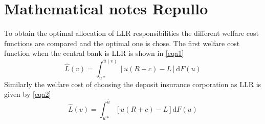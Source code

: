 \documentclass[twoside, 12pt]{article}
\numberwithin{equation}{section}
\begin{document}
\newpage
\appendix
\section{Mathematical notes Repullo}
To obtain the optimal allocation of LLR responsibilities the different welfare cost functions are compared and the optimal one is chose. The first welfare cost function when the central bank is LLR is shown in \autoref{eqa1}
\begin{equation}\label{eqa1}
\hat{L}(v)=\int_{u*}^{\hat{u}(v)}[u(R+c)-L]\mathrm{d}F(u)
\end{equation}
Similarly the welfare cost of choosing the deposit insurance corporation as LLR is given by \autoref{eqa2}
\begin{equation}\label{eqa2}
\hat{L}(v)=\int_{u*}^{\bar{u}}[u(R+c)-L]\mathrm{d}F(u)
\end{equation}



\end{document}
